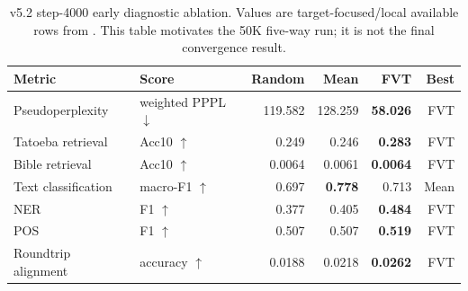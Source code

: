 \begin{table}[t]
\centering
\caption{v5.2 step-4000 early diagnostic ablation. Values are target-focused/local available rows from . This table motivates the 50K five-way run; it is not the final convergence result.}
\label{tab:ablation-results}
\begin{tabular}{llrrrr}
\toprule
Metric & Score & Random & Mean & FVT & Best \\
\midrule
Pseudoperplexity & weighted PPPL $\downarrow$ & 119.582 & 128.259 & \textbf{58.026} & FVT \\
Tatoeba retrieval & Acc10 $\uparrow$ & 0.249 & 0.246 & \textbf{0.283} & FVT \\
Bible retrieval & Acc10 $\uparrow$ & 0.0064 & 0.0061 & \textbf{0.0064} & FVT \\
Text classification & macro-F1 $\uparrow$ & 0.697 & \textbf{0.778} & 0.713 & Mean \\
NER & F1 $\uparrow$ & 0.377 & 0.405 & \textbf{0.484} & FVT \\
POS & F1 $\uparrow$ & 0.507 & 0.507 & \textbf{0.519} & FVT \\
Roundtrip alignment & accuracy $\uparrow$ & 0.0188 & 0.0218 & \textbf{0.0262} & FVT \\
\bottomrule
\end{tabular}
\end{table}

